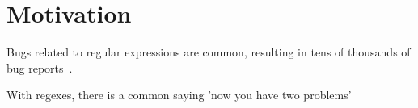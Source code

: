 \section{Motivation}

Bugs related to regular expressions are common, resulting in tens of thousands of bug reports~\cite{Spishak:2012:TSR:2318202.2318207}.

With regexes, there is a common saying 'now you have two problems'
